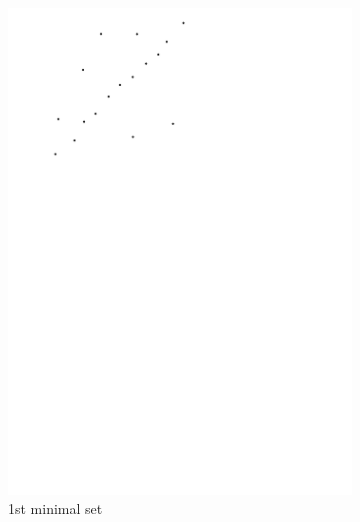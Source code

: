 \begin{figure}
\begin{subfigure}[b]{0.24\linewidth}
		\centering
		\includegraphics[width=\textwidth,page=2]{ransac.pdf}
		\caption{1st minimal set}\label{fig:ransac:b}
	\end{subfigure}
	\begin{subfigure}[b]{0.24\linewidth}
		\centering

\end{subfigure}
\end{figure}
